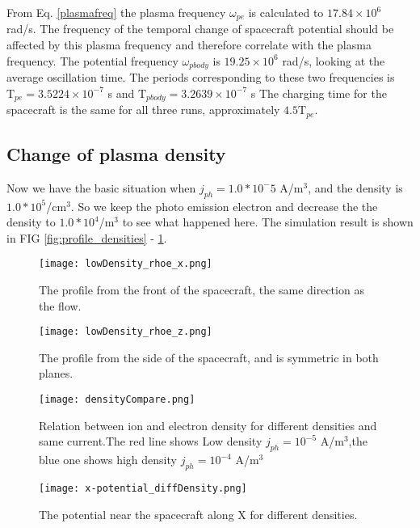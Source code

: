 \documentclass[aip, 
rsi, 
amsmath,
amssymb,
longbibliography,
preprint]{revtex4-1}
\begin{document}
From Eq. \ref{plasmafreq} the plasma frequency $\omega_{pe}$ is calculated to $17.84 \times 10^6$ rad/s. The frequency of the temporal change of spacecraft potential should be affected by this plasma frequency and therefore correlate with the plasma frequency. The potential frequency $\omega_{pbody}$ is $19.25 \times 10^6$ rad/s, looking at the average oscillation time. The periods corresponding to these two frequencies is $\mathrm{T}_{pe} = 3.5224 \times 10^{-7}$ s and $\mathrm{T}_{pbody} = 3.2639 \times 10^{-7}$ s The charging time for the spacecraft is the same for all three runs, approximately $4.5\mathrm{T}_{pe}$.

\subsection{Change of plasma density}

Now we have the basic situation when $j_{ph}= 1.0*10^-5$ A/m$^3$, and the density is $1.0*10^5$/cm$^3$. So we keep the photo emission electron and decrease the the density to $1.0*10^4$/m$^3$ to see what happened here. The simulation result is shown in FIG \ref{fig:profile_densities} - \ref{fig:end}.

\begin{figure*}[!ht]
\begin{subfigure}{0.45\textwidth}
\texttt{[image: lowDensity\_rhoe\_x.png]}
\caption{The profile from the front of the spacecraft, the same direction as the flow.}
\end{subfigure}
\begin{subfigure}{0.45\textwidth}
\texttt{[image: lowDensity\_rhoe\_z.png]}
\caption{The profile from the side of the spacecraft, and is symmetric in both planes.}
\end{subfigure}
\caption{The situation when we have lowered the density by an order of 1 and the photo emission is $j_{ph} = 10^{-5}$ A/m$^3$} \label{fig:profile_densities}
\end{figure*}

\begin{figure}[!ht]
\texttt{[image: densityCompare.png]}
\caption{Relation between ion and electron density for different densities and same current.The red line shows Low density $j_{ph} = 10^{-5}$ A/m$^3$,the blue one shows high density $j_{ph} = 10^{-4}$ A/m$^3$}
\end{figure}

\begin{figure}[!ht]
\texttt{[image: x-potential\_diffDensity.png]}
\caption{The potential near the spacecraft along X for different densities. \label{fig:end}}
\end{figure}
\end{document}
